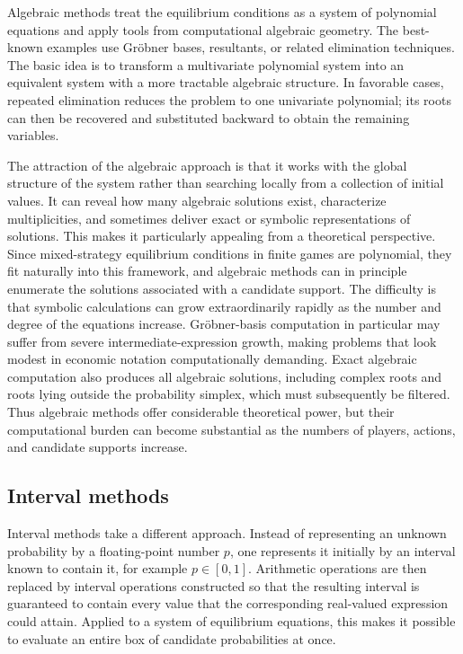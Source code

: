 \documentclass[11pt]{article}
\begin{document}
Algebraic methods treat the equilibrium conditions as a system of
polynomial equations and apply tools from computational algebraic
geometry. The best-known examples use Gröbner bases, resultants, or
related elimination techniques. The basic idea is to transform a
multivariate polynomial system into an equivalent system with a more
tractable algebraic structure. In favorable cases, repeated elimination
reduces the problem to one univariate polynomial; its roots can then be
recovered and substituted backward to obtain the remaining variables.

The attraction of the algebraic approach is that it works with the
global structure of the system rather than searching locally from a
collection of initial values. It can reveal how many algebraic solutions
exist, characterize multiplicities, and sometimes deliver exact or
symbolic representations of solutions. This makes it particularly
appealing from a theoretical perspective. Since mixed-strategy
equilibrium conditions in finite games are polynomial, they fit
naturally into this framework, and algebraic methods can in principle
enumerate the solutions associated with a candidate support. The
difficulty is that symbolic calculations can grow extraordinarily
rapidly as the number and degree of the equations increase.
Gröbner-basis computation in particular may suffer from severe
intermediate-expression growth, making problems that look modest in
economic notation computationally demanding. Exact algebraic computation
also produces all algebraic solutions, including complex roots and roots
lying outside the probability simplex, which must subsequently be
filtered. Thus algebraic methods offer considerable theoretical power,
but their computational burden can become substantial as the numbers of
players, actions, and candidate supports increase.

\subsection{Interval methods}\label{interval-methods}

Interval methods take a different approach. Instead of representing an
unknown probability by a floating-point number \(p\), one represents it
initially by an interval known to contain it, for example \(p\in[0,1]\).
Arithmetic operations are then replaced by interval operations
constructed so that the resulting interval is guaranteed to contain
every value that the corresponding real-valued expression could attain.
Applied to a system of equilibrium equations, this makes it possible to
evaluate an entire box of candidate probabilities at once.
\end{document}
